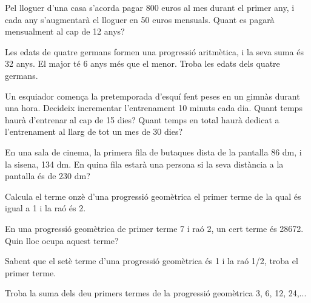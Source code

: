 \begin{activitats}
\begin{mylist}
\exer  Pel lloguer d'una casa s'acorda pagar 800 euros al mes durant el primer any, i cada any s'augmentarà el lloguer en 50 euros mensuals. Quant es pagarà mensualment al cap de 12 anys? 

\exer  Les edats de quatre germans formen una progressió aritmètica, i la seva suma és 32 anys. El major té 6 anys més que el menor. Troba les edats dels quatre germans. 

\exer  Un esquiador comença la pretemporada d'esquí fent peses en un gimnàs durant una hora. Decideix incrementar l'entrenament 10 minuts cada dia. Quant temps haurà d'entrenar al cap de 15 dies? Quant temps en total haurà dedicat a l'entrenament al llarg de tot un mes de 30 dies? 
\answers{[$a_{15} = 200$ minuts, 6150 minuts en un mes.]}

\exer  En una sala de cinema, la primera fila de butaques dista de la pantalla 86 dm, i la sisena, 134 dm. En quina fila estarà una persona si la seva distància a la pantalla és de 230 dm? 

\exer  Calcula el terme onzè d'una progressió geomètrica el primer terme de la qual és igual a 1 i la raó és 2. 

\exer  En una progressió geomètrica de primer terme 7 i raó 2, un cert terme és 28672. Quin lloc ocupa aquest terme? 

\exer  Sabent que el setè terme d'una progressió geomètrica és 1 i la raó 1/2, troba el primer terme. 

\exer  Troba la suma dels deu primers termes de la progressió geomètrica 3, 6, 12, 24,... 


\end{mylist}
\end{activitats}

